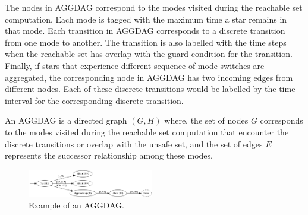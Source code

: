 
The nodes in AGGDAG correspond to the modes visited during the reachable set computation. Each mode is tagged with the maximum time a star remains in that mode. Each transition in AGGDAG corresponds to a discrete transition from one mode to another. The transition is also labelled with the time steps when the reachable set has overlap with the guard condition for the transition. Finally, if stars that experience different sequence of mode switches are aggregated, the corresponding node in AGGDAG has two incoming edges from different nodes. Each of these discrete transitions would be labelled by the time interval for the corresponding discrete transition.

\begin{definition}
\label{def:aggdag}
An AGGDAG is a directed graph $(G, H)$ where, the set of nodes $G$ corresponds to the modes visited during the reachable set computation that encounter the discrete transitions or overlap with the unsafe set, and the set of edges $E$ represents the successor relationship among these modes.
\end{definition}

\begin{figure}[t]
\centering
\includegraphics[width=0.49\textwidth]{images/viz2}
\caption{Example of an AGGDAG.}
\label{fig:aggdagex1}
\end{figure}


